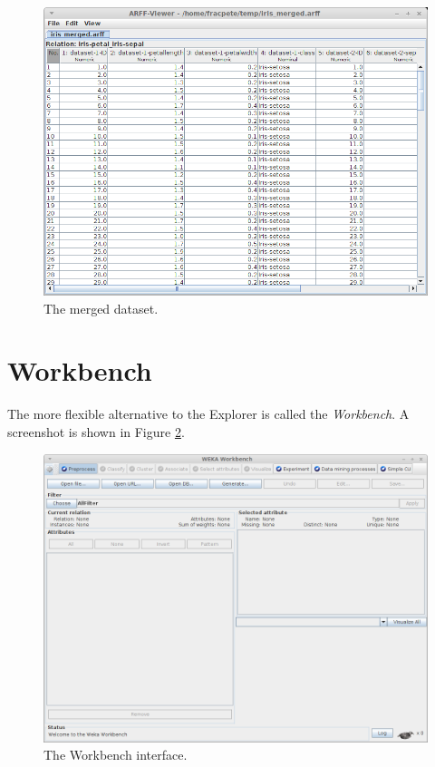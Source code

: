 \begin{figure}[htb]
  \centering
  \includegraphics[width=12.0cm]{images/merge_datasets-output.png}
  \caption{The merged dataset.}
  \label{merge_datasets-output}
\end{figure}

\clearpage
\section{Workbench}
The more flexible alternative to the Explorer is called the \textit{Workbench}.
A screenshot is shown in Figure \ref{workbench}.

\begin{figure}[htb]
  \centering
  \includegraphics[width=12.0cm]{images/workbench.png}
  \caption{The Workbench interface.}
  \label{workbench}
\end{figure}
